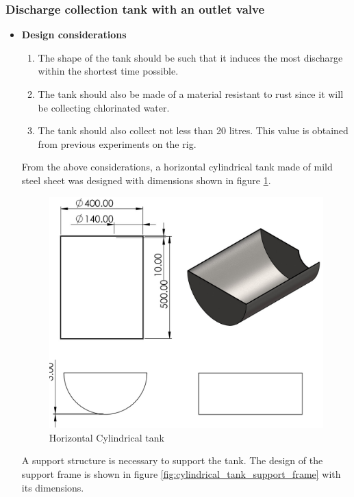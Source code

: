 \subsubsection{Discharge collection tank with an outlet valve}
\begin{itemize}
    \item \textbf{Design considerations}
        \begin{enumerate}
            \item The shape of the tank should be such that it induces the most discharge within the shortest time possible.
            \item The tank should also be made of a material resistant to rust since it will be collecting chlorinated water.
            \item The tank should also collect not less than 20 litres. This value is obtained from previous experiments on the rig.
        \end{enumerate}
        From the above considerations, a horizontal cylindrical tank made of mild steel sheet was designed with dimensions shown in figure \ref{fig:horizontal_cylindrical_tank}. 
        \begin{figure}[H]
        \centering
        \includegraphics{Figures/tank.jpg}
        \caption{Horizontal Cylindrical tank}
        \label{fig:horizontal_cylindrical_tank}
        \end{figure}
        A support structure is necessary to support the tank. The design of the support frame is shown in figure \ref{fig:cylindrical_tank_support_frame} with its dimensions.

\end{itemize}
